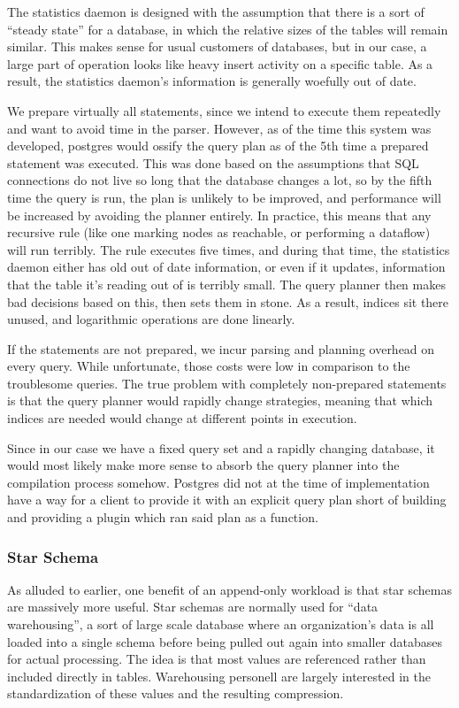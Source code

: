 The statistics daemon is designed with the assumption that there is a sort of ``steady state'' for a database, in which the relative sizes of the tables will remain similar.
This makes sense for usual customers of databases, but in our case, a large part of operation looks like heavy insert activity on a specific table.
As a result, the statistics daemon's information is generally woefully out of date.

We prepare virtually all statements, since we intend to execute them repeatedly and want to avoid time in the parser.
However, as of the time this system was developed, postgres would ossify the query plan as of the 5th time a prepared statement was executed.
This was done based on the assumptions that SQL connections do not live so long that the database changes a lot, so by the fifth time the query is run, the plan is unlikely to be improved, and performance will be increased by avoiding the planner entirely.
In practice, this means that any recursive rule (like one marking nodes as reachable, or performing a dataflow) will run terribly.
The rule executes five times, and during that time, the statistics daemon either has old out of date information, or even if it updates, information that the table it's reading out of is terribly small.
The query planner then makes bad decisions based on this, then sets them in stone.
As a result, indices sit there unused, and logarithmic operations are done linearly.

If the statements are not prepared, we incur parsing and planning overhead on every query.
While unfortunate, those costs were low in comparison to the troublesome queries.
The true problem with completely non-prepared statements is that the query planner would rapidly change strategies, meaning that which indices are needed would change at different points in execution.

Since in our case we have a fixed query set and a rapidly changing database, it would most likely make more sense to absorb the query planner into the compilation process somehow.
Postgres did not at the time of implementation have a way for a client to provide it with an explicit query plan short of building and providing a plugin which ran said plan as a function.

\subsubsection{Star Schema}
As alluded to earlier, one benefit of an append-only workload is that star schemas are massively more useful.
Star schemas are normally used for ``data warehousing'', a sort of large scale database where an organization's data is all loaded into a single schema before being pulled out again into smaller databases for actual processing.
The idea is that most values are referenced rather than included directly in tables.
Warehousing personell are largely interested in the standardization of these values and the resulting compression.

